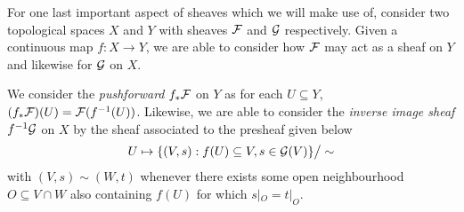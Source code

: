 For one last important aspect of sheaves which we will make use of,
consider two topological spaces $X$ and $Y$ with sheaves $\mathcal{F}$ and $\mathcal{G}$ respectively.
Given a continuous map $f : X \to Y$, 
we are able to consider how $\mathcal{F}$ may act as a sheaf on $Y$ and likewise for $\mathcal{G}$ on $X$.

We consider the \textit{pushforward} $f_*\mathcal{F}$ on $Y$ as for each $U \subseteq Y$, $(f_*\mathcal{F})(U) = \mathcal{F}(f^{-1}(U))$.
Likewise, we are able to consider the \textit{inverse image sheaf} $f^{-1}\mathcal{G}$ on $X$ by the sheaf associated to the presheaf given below
\[
    U \mapsto \{ (V, s) : f(U) \subseteq V, s \in \mathcal{G}(V) \}
     \big / \sim
\]
with $(V, s) \sim (W, t)$ whenever there exists some open neighbourhood $O \subseteq V \cap W$ also containing $f(U)$ for which $s|_O = t|_O$.
